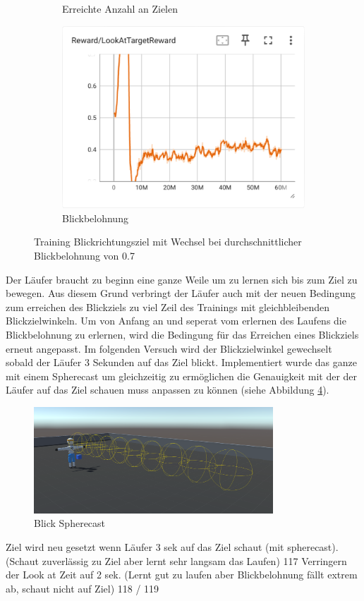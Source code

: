 \begin{figure}[H]
\begin{subfigure}{.49\textwidth}
      \caption{Erreichte Anzahl an Zielen}
      \label{fig:113_reach_target}
    \end{subfigure}
    \begin{subfigure}{.49\textwidth}
      \centering  
      \includegraphics[width=\textwidth]{img/113_look_reward}
      \caption{Blickbelohnung}
      \label{fig:113_look_reward}
    \end{subfigure}
  \caption{Training Blickrichtungsziel mit Wechsel bei durchschnittlicher Blickbelohnung von 0.7}
  \label{fig:training_blickrichtungsziel_wechsel_07}
\end{figure}

Der Läufer braucht zu beginn eine ganze Weile um zu lernen sich bis zum Ziel zu bewegen. Aus diesem Grund verbringt der Läufer auch mit der neuen Bedingung zum erreichen des Blickziels zu viel Zeil des Trainings mit gleichbleibenden Blickzielwinkeln. Um von Anfang an und seperat vom erlernen des Laufens die Blickbelohnung zu erlernen, wird die Bedingung für das Erreichen eines Blickziels erneut angepasst. Im folgenden Versuch wird der Blickzielwinkel gewechselt sobald der Läufer 3 Sekunden auf das Ziel blickt. Implementiert wurde das ganze mit einem Spherecast um gleichzeitig zu ermöglichen die Genauigkeit mit der der Läufer auf das Ziel schauen muss anpassen zu können (siehe Abbildung \ref{fig:spherecast}).

\begin{figure}[H]
  \centering  
  \includegraphics[width=0.8\textwidth]{img/spherecast}
  \caption{Blick Spherecast}
  \label{fig:spherecast}
\end{figure}

Ziel wird neu gesetzt wenn Läufer 3 sek auf das Ziel schaut (mit spherecast). (Schaut zuverlässig zu Ziel aber lernt sehr langsam das Laufen) 117
Verringern der Look at Zeit auf 2 sek. (Lernt gut zu laufen aber Blickbelohnung fällt extrem ab, schaut nicht auf Ziel) 118 / 119